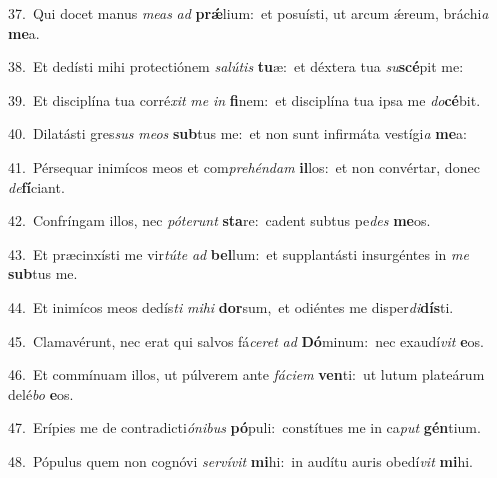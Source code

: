 {\numbfont\textcolor{\numbcolor}{37.}}~Qui docet manus \textit{me}\-\textit{as} \textit{ad} \textbf{prǽ}\-lium:~\star et posuísti, ut arcum ǽreum, bráchi\textit{a} \textbf{me}\-a.\par
{\numbfont\textcolor{\numbcolor}{38.}}~Et dedísti mihi protectiónem \textit{sa}\-\textit{lú}\textit{tis} \textbf{tu}\-æ:~\star et déxtera tua \textit{su}\-\textbf{scé}pit me:\par
{\numbfont\textcolor{\numbcolor}{39.}}~Et disciplína tua corré\textit{xit} \textit{me} \textit{in} \textbf{fi}\-nem:~\star et disciplína tua ipsa me \textit{do}\-\textbf{cé}bit.\par
{\numbfont\textcolor{\numbcolor}{40.}}~Dilatásti gres\textit{sus} \textit{me}\-\textit{os} \textbf{sub}\-tus me:~\star et non sunt infirmáta vestígi\textit{a} \textbf{me}\-a:\par
{\numbfont\textcolor{\numbcolor}{41.}}~Pérsequar inimícos meos et com\-\textit{pre}\-\textit{hén}\textit{dam} \textbf{il}\-los:~\star et non convértar, donec \textit{de}\-\textbf{fí}ciant.\par
{\numbfont\textcolor{\numbcolor}{42.}}~Confríngam illos, nec \textit{pót}\-\textit{e}\textit{runt} \textbf{sta}\-re:~\star cadent subtus pe\textit{des} \textbf{me}\-os.\par
{\numbfont\textcolor{\numbcolor}{43.}}~Et præcinxísti me vir\-\textit{tú}\-\textit{te} \textit{ad} \textbf{bel}\-lum:~\star et supplantásti insurgéntes in \textit{me} \textbf{sub}\-tus me.\par
{\numbfont\textcolor{\numbcolor}{44.}}~Et inimícos meos dedís\textit{ti} \textit{mi}\-\textit{hi} \textbf{dor}\-sum,~\star et odiéntes me disper\-\textit{di}\-\textbf{dís}ti.\par
{\numbfont\textcolor{\numbcolor}{45.}}~Clamavérunt, nec erat qui salvos fá\-\textit{ce}\-\textit{ret} \textit{ad} \textbf{Dó}\-minum:~\star nec exaudí\textit{vit} \textbf{e}\-os.\par
{\numbfont\textcolor{\numbcolor}{46.}}~Et commínuam illos, ut púlverem ante \textit{fá}\-\textit{ci}\textit{em} \textbf{ven}\-ti:~\star ut lutum plateárum delé\textit{bo} \textbf{e}\-os.\par
{\numbfont\textcolor{\numbcolor}{47.}}~Erípies me de contradicti\-\textit{ó}\-\textit{ni}\textit{bus} \textbf{pó}\-puli:~\star constítues me in ca\textit{put} \textbf{gén}\-tium.\par
{\numbfont\textcolor{\numbcolor}{48.}}~Pópulus quem non cognóvi \textit{ser}\-\textit{ví}\textit{vit} \textbf{mi}\-hi:~\star in audítu auris obedí\textit{vit} \textbf{mi}\-hi.\par
